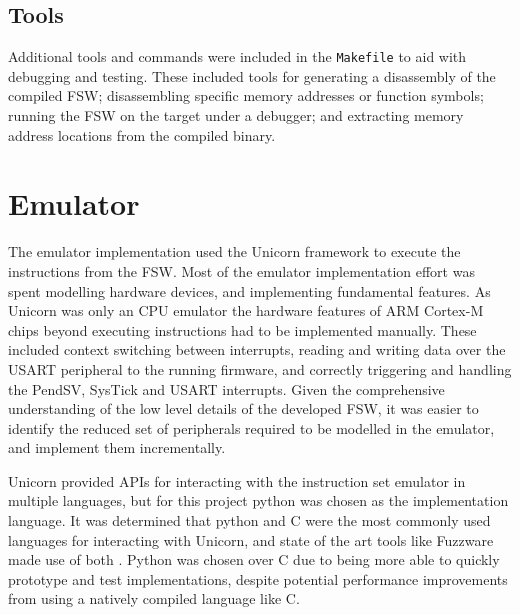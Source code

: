 \documentclass[../report.tex]{subfiles}
\begin{document}
\subsection{Tools} \label{sec:fsw-tools}

Additional tools and commands were included in the \lstinline|Makefile| to aid
with debugging and testing. These included tools for generating a disassembly
of the compiled FSW; disassembling specific memory addresses or function
symbols; running the FSW on the target under a debugger; and extracting memory
address locations from the compiled binary.





\section{Emulator}


The emulator implementation used the Unicorn framework \citep{Unicorn} to execute the
instructions from the FSW. Most of the emulator implementation effort was spent
modelling hardware devices, and implementing fundamental features. As Unicorn
was only an CPU emulator \citep{Unicorn} the hardware features of ARM Cortex-M
chips beyond executing instructions had to be implemented manually. These
included context switching between interrupts, reading and writing data over
the USART peripheral to the running firmware, and correctly triggering and
handling the PendSV, SysTick and USART interrupts. Given the comprehensive
understanding of the low level details of the developed FSW, it was easier to
identify the reduced set of peripherals required to be modelled in the
emulator, and implement them incrementally.

Unicorn provided APIs for interacting with the instruction set emulator in
multiple languages, but for this project python was chosen as the
implementation language. It was determined that python and C were the most
commonly used languages for interacting with Unicorn, and state of the art
tools like Fuzzware made use of both \citep{Fuzzware_2022}. Python was chosen
over C due to being more able to quickly prototype and test implementations,
despite potential performance improvements from using a natively compiled
language like C.
\end{document}

